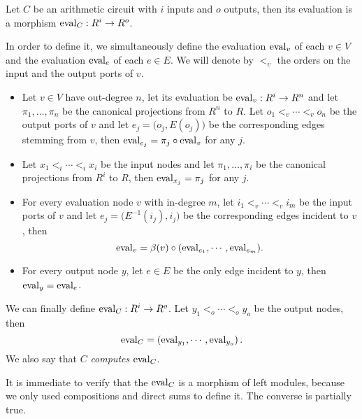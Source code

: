 \begin{definition}
  \label{def:eval}
  Let $C$ be an arithmetic circuit with $i$ inputs and $o$ outputs,
  then its evaluation is a morphism $\operatorname{eval}_C:R^i\rightarrow
  R^o$.

  In order to define it, we simultaneously define the evaluation
  $\operatorname{eval}_v$ of each $v\in V$ and the evaluation $\operatorname{eval}_e$ of each
  $e\in E$. We will denote by $<_v$ the orders on the input and the
  output ports of $v$.
  \begin{itemize}
  \item Let $v\in V$ have out-degree $n$, let its evaluation be
    $\operatorname{eval}_v:R^i\rightarrow R^n$ and let $\pi_1,\ldots,\pi_n$ be the canonical
    projections from $R^n$ to $R$. Let $o_1<_v\cdots<_vo_n$ be the
    output ports of $v$ and let $e_j=\bigl(o_j,E(o_j)\bigr)$ be the
    corresponding edges stemming from $v$, then $\operatorname{eval}_{e_j} =
    \pi_j\circ\operatorname{eval}_v$ for any $j$.
  \item Let $x_1<_i\cdots<_ix_i$ be the input nodes and let
    $\pi_1,\ldots,\pi_i$ be the canonical projections from $R^i$ to
    $R$, then $\operatorname{eval}_{x_j}=\pi_j$ for any $j$.
  \item For every evaluation node $v$ with in-degree $m$, let
    $i_1<_v\cdots<_vi_m$ be the input ports of $v$ and let
    $e_j=\bigl(E^{-1}(i_j),i_j\bigr)$ be the corresponding edges
    incident to $v$, then
    \begin{equation}
      \label{eq:eval_v}
      \operatorname{eval}_v = \beta(v) \circ (\operatorname{eval}_{e_1}, \cdots,\operatorname{eval}_{e_m})
      \text{.}
    \end{equation}
  \item For every output node $y$, let $e\in E$ be the only edge
    incident to $y$, then $\operatorname{eval}_y=\operatorname{eval}_e$.
  \end{itemize}

  We can finally define $\operatorname{eval}_C:R^i\rightarrow R^o$. Let $y_1<_o\cdots<_oy_o$
  be the output nodes, then
  \begin{equation}
    \label{eq:eval}
    \operatorname{eval}_C = \left(\operatorname{eval}_{y_1}, \cdots,\operatorname{eval}_{y_o}\right)
    \text{.}
  \end{equation}
  We also say that $C$ \emph{computes} $\operatorname{eval}_C$.
\end{definition}

It is immediate to verify that the $\operatorname{eval}_C$ is a morphism of left
modules, because we only used compositions and direct sums to define
it. The converse is partially true.

